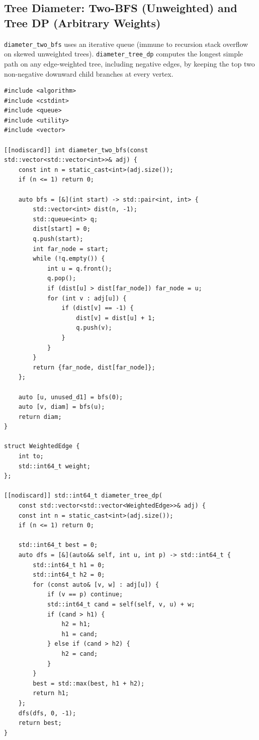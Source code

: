 \documentclass[11pt,a4paper]{article}
\theoremstyle{definition}
\begin{document}
\subsection{Tree Diameter: Two-BFS (Unweighted) and Tree DP (Arbitrary Weights)}

\texttt{diameter\_two\_bfs} uses an iterative queue (immune to recursion stack overflow on skewed unweighted trees). \texttt{diameter\_tree\_dp} computes the longest simple path on any edge-weighted tree, including negative edges, by keeping the top two non-negative downward child branches at every vertex.

\begin{lstlisting}[caption={Tree diameter via iterative Two-BFS (unweighted) and bottom-up Tree DP (weighted).}]
#include <algorithm>
#include <cstdint>
#include <queue>
#include <utility>
#include <vector>

[[nodiscard]] int diameter_two_bfs(const std::vector<std::vector<int>>& adj) {
    const int n = static_cast<int>(adj.size());
    if (n <= 1) return 0;

    auto bfs = [&](int start) -> std::pair<int, int> {
        std::vector<int> dist(n, -1);
        std::queue<int> q;
        dist[start] = 0;
        q.push(start);
        int far_node = start;
        while (!q.empty()) {
            int u = q.front();
            q.pop();
            if (dist[u] > dist[far_node]) far_node = u;
            for (int v : adj[u]) {
                if (dist[v] == -1) {
                    dist[v] = dist[u] + 1;
                    q.push(v);
                }
            }
        }
        return {far_node, dist[far_node]};
    };

    auto [u, unused_d1] = bfs(0);
    auto [v, diam] = bfs(u);
    return diam;
}

struct WeightedEdge {
    int to;
    std::int64_t weight;
};

[[nodiscard]] std::int64_t diameter_tree_dp(
    const std::vector<std::vector<WeightedEdge>>& adj) {
    const int n = static_cast<int>(adj.size());
    if (n <= 1) return 0;

    std::int64_t best = 0;
    auto dfs = [&](auto&& self, int u, int p) -> std::int64_t {
        std::int64_t h1 = 0;
        std::int64_t h2 = 0;
        for (const auto& [v, w] : adj[u]) {
            if (v == p) continue;
            std::int64_t cand = self(self, v, u) + w;
            if (cand > h1) {
                h2 = h1;
                h1 = cand;
            } else if (cand > h2) {
                h2 = cand;
            }
        }
        best = std::max(best, h1 + h2);
        return h1;
    };
    dfs(dfs, 0, -1);
    return best;
}
\end{lstlisting}
\end{document}
